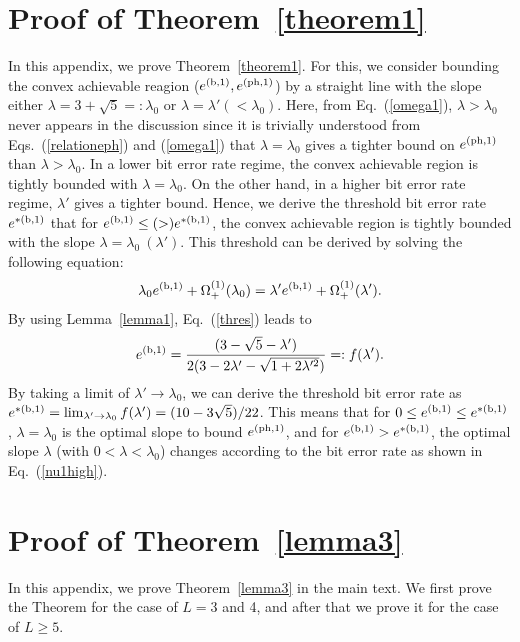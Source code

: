\documentclass[prl,twocolumn,superscriptaddress,nofootinbib]{revtex4}
\def\U#1{{\rm #1}}
\begin{document}
\begin{widetext}
      \section{Proof of Theorem~\ref{theorem1}}
      \label{sec:appTheorem}
      In this appendix, we prove Theorem~\ref{theorem1}. For this, we consider bounding the convex achievable 
    reagion ($e^{(\U{b},1)},e^{(\U{ph},1)}$) by a straight line with 
    the slope either $\lambda=3+\sqrt{5}=:\lambda_0$ or $\lambda=\lambda'(<\lambda_0)$.
    Here, from Eq.~(\ref{omega1}), $\lambda>\lambda_0$ never appears in the discussion since it is trivially understood
    from Eqs.~(\ref{relationeph}) and (\ref{omega1}) that $\lambda=\lambda_0$ gives a tighter bound on $e^{(\U{ph},1)}$ 
    than $\lambda>\lambda_0$. In a lower bit error rate regime, the convex achievable region is tightly bounded with
    $\lambda=\lambda_0$.
    On the other hand, in a higher bit error rate regime, $\lambda'$ gives a tighter bound. 
    Hence, we derive the threshold bit error rate $e^{*(\U{b},1)}$ that for $e^{(\U{b},1)}\leq (>)e^{*(\U{b},1)}$, the convex achievable
    region is tightly bounded with the slope $\lambda=\lambda_0~(\lambda')$. 
    This threshold can be derived by solving the following equation:
    \begin{align}
      \lambda_0e^{(\U{b},1)}+\Omega^{(1)}_+(\lambda_0)=\lambda' e^{(\U{b},1)}+\Omega^{(1)}_+(\lambda').\label{thres}
    \end{align}
    By using Lemma~\ref{lemma1}, Eq.~(\ref{thres}) leads to 
    \begin{align}
      e^{(\U{b},1)}=\frac{(3-\sqrt{5}-\lambda')}{2(3-2\lambda'-\sqrt{1+2\lambda'^2})}=:f(\lambda').
    \end{align}
    By taking a limit of $\lambda'\rightarrow\lambda_0$, we can derive the threshold bit error rate as 
    $e^{*(\U{b},1)}=\lim_{\lambda'\rightarrow\lambda_0} f(\lambda')=(10-3\sqrt{5})/22$. 
    This means that for $0\leq e^{(\U{b},1)}\leq e^{*(\U{b},1)}$, $\lambda=\lambda_0$ is the optimal slope to bound 
    $e^{(\U{ph},1)}$, and for $e^{(\U{b},1)}>e^{*(\U{b},1)}$, the optimal slope $\lambda$
    (with $0<\lambda< \lambda_0$) changes according to the bit error rate as shown in Eq.~(\ref{nu1high}). 
      
    \section{Proof of Theorem~\ref{lemma3}} 
    \label{sec:apC}
    In this appendix, we prove Theorem~\ref{lemma3} in the main text.
    We first prove the Theorem for the case of $L=3$ and 4, and after that we prove it for the case of $L\geq5$.
    

\end{widetext}
\end{document}

